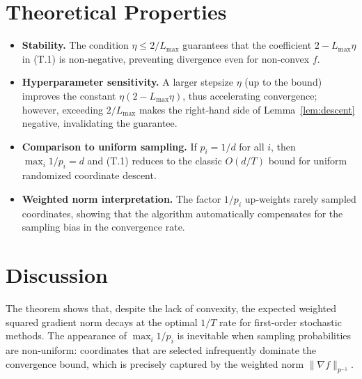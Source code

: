 \documentclass{article}
\begin{document}
\section*{Theoretical Properties}
\begin{itemize}[leftmargin=*]
\item \textbf{Stability.}  The condition $\eta\le 2/L_{\max}$ guarantees that the
coefficient $2-L_{\max}\eta$ in (T.1) is non‑negative, preventing divergence
even for non‑convex $f$.
\item \textbf{Hyperparameter sensitivity.}
A larger stepsize $\eta$ (up to the bound) improves the constant
$\eta(2-L_{\max}\eta)$, thus accelerating convergence; however, exceeding
$2/L_{\max}$ makes the right‑hand side of Lemma~\ref{lem:descent} negative,
invalidating the guarantee.
\item \textbf{Comparison to uniform sampling.}
If $p_i=1/d$ for all $i$, then $\max_i 1/p_i=d$ and (T.1) reduces to the classic
$O(d/T)$ bound for uniform randomized coordinate descent.
\item \textbf{Weighted norm interpretation.}
The factor $1/p_i$ up‑weights rarely sampled coordinates, showing that the
algorithm automatically compensates for the sampling bias in the convergence
rate.
\end{itemize}

\section*{Discussion}
The theorem shows that, despite the lack of convexity, the expected
weighted squared gradient norm decays at the optimal $1/T$ rate for
first‑order stochastic methods.  The appearance of $\max_i 1/p_i$ is inevitable
when sampling probabilities are non‑uniform: coordinates that are selected
infrequently dominate the convergence bound, which is precisely captured by
the weighted norm $\|\nabla f\|_{p^{-1}}$.

\newpage
\end{document}
